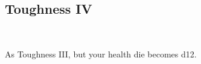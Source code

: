 \subsection*{Toughness IV}\label{feat:toughness4}
 \\

As Toughness III, but your health die becomes d12.
